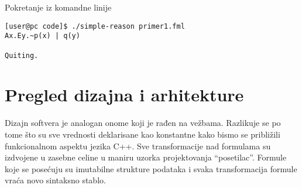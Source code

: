 \documentclass[a4paper]{article}
\begin{document}
\bigskip
Pokretanje iz komandne linije
\begin{verbatim}
[user@pc code]$ ./simple-reason primer1.fml
Ax.Ey.~p(x) | q(y)

Quiting.
\end{verbatim}

\section{Pregled dizajna i arhitekture}
\label{sec:dizajn}
Dizajn softvera je analogan onome koji je rađen na vežbama. Razlikuje se po tome što su sve vrednosti deklarisane kao konstantne kako bismo se približili funkcionalnom aspektu jezika C++. Sve transformacije nad formulama su izdvojene u zasebne celine u maniru uzorka projektovanja ``posetilac''. Formule koje se posećuju su imutabilne strukture podataka i svaka transformacija formule vraća novo sintaksno stablo.
\end{document}
